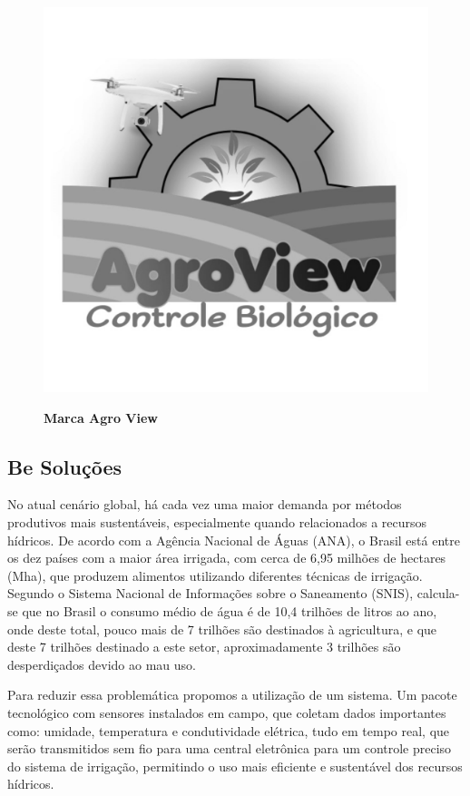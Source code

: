 \begin{figure}[!htb]
\centering
\caption{\textbf{Marca Agro View}}
\includegraphics[scale=0.2]{Imagens/agroview.jpg}
\label{figura_19}
\end{figure}


\subsection{Be Soluções}

No atual cenário global, há cada vez uma maior demanda por métodos produtivos mais sustentáveis, especialmente quando relacionados a recursos hídricos. De acordo com a Agência Nacional de Águas (ANA), o Brasil está entre os dez países com a maior área irrigada, com cerca de 6,95 milhões de hectares (Mha), que produzem alimentos utilizando diferentes técnicas de irrigação. Segundo o Sistema Nacional de Informações sobre o Saneamento (SNIS), calcula-se que no Brasil o consumo médio de água é de 10,4 trilhões de litros ao ano, onde deste total, pouco mais de 7 trilhões são destinados à agricultura, e que deste 7 trilhões destinado a este setor, aproximadamente 3 trilhões são desperdiçados devido ao mau uso.

Para reduzir essa problemática propomos a utilização de um sistema. Um pacote tecnológico com sensores instalados em campo, que coletam dados importantes como: umidade, temperatura e condutividade elétrica, tudo em tempo real, que serão transmitidos sem fio para uma central eletrônica para um controle preciso do sistema
de irrigação, permitindo o uso mais eficiente e sustentável dos recursos hídricos.

